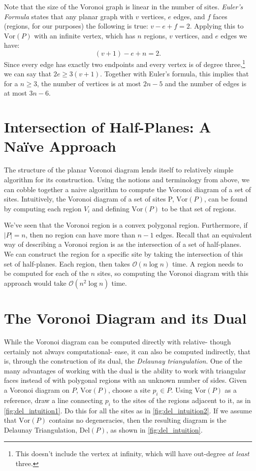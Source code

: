 \documentclass[12pt,twoside]{reedthesis}
\begin{document}
    Note that the size of the Voronoi graph is linear in the number of sites. \emph{Euler's Formula} states that any planar graph with $v$ vertices, $e$ edges, and $f$ faces (regions, for our purposes) the following is true:
    $v - e + f = 2.$ Applying this to $\mbox{Vor}(P)$ with an infinite vertex, which has $n$ regions, $v$ vertices, and $e$ edges we have:
    $$(v + 1) - e + n = 2.$$ Since every edge has exactly two endpoints and every vertex is of degree three,\footnote{This doesn't include the vertex at infinity, which will have out-degree \emph{at least} three.} we can say that $2e \geq 3(v + 1)$. Together with Euler's formula, this implies that for a $n\geq 3$, the number of vertices is at most $2n -5$ and the number of edges is at most $3n -6$. 
  \section{Intersection of Half-Planes: A Na{\"i}ve Approach} %
  \label{sec:a_naive_approach}
    The structure of the planar Voronoi diagram lends itself to relatively simple algorithm for its construction. Using the notions and terminology from above, we can cobble together a naive algorithm to compute the Voronoi diagram of a set of sites. Intuitively, the Voronoi diagram of a set of sites P, $\mbox{Vor}(P)$, can be found by computing each region $V_{i}$ and defining $\mbox{Vor}(P)$ to be that set of regions. \par

    We've seen that the Voronoi region is a convex polygonal region. Furthermore, if $|P| = n$, then no region can have more than $n-1$ edges. Recall that an equivalent way of describing a Voronoi region is as the intersection of a set of half-planes. We can construct the region for a specific site by taking the intersection of this set of half-planes. Each region, then takes $\mathcal{O}(n\log n)$ time. A region needs to be computed for each of the $n$ sites, so computing the Voronoi diagram with this approach would take $\mathcal{O}(n^{2}\log n)$ time.
  
  \section{The Voronoi Diagram and its Dual} %
  \label{sec:the_voronoi_diagram_and_its_dual}
    While the Voronoi diagram can be computed directly with relative- though certainly not always computational- ease, it can also be computed indirectly, that is, through the construction of its dual, the \emph{Delaunay triangulation}. One of the many advantages of working with the dual is the ability to work with triangular faces instead of with polygonal regions with an unknown number of sides. Given a Voronoi diagram on $P$, $\mbox{Vor}(P)$, choose a site $p_{i} \in P$. Using $\mbox{Vor}(P)$ as a reference, draw a line connecting $p_{i}$ to the sites of the regions adjacent to it, as in \cref{fig:del_intuition1}. Do this for all the sites as in \cref{fig:del_intuition2}. If we assume that $\mbox{Vor}(P)$ contains no degeneracies, then the resulting diagram is the Delaunay Triangulation, $\mbox{Del}(P)$, as shown in \cref{fig:del_intuition}.
\end{document}
